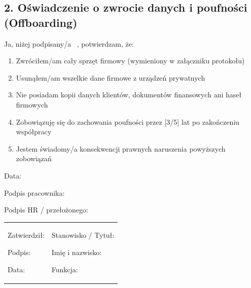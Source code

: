 \documentclass[12pt,a4paper]{article}
\providecommand{\tightlist}{\setlength{\itemsep}{0pt}\setlength{\parskip}{0pt}}
\begin{document}
\subsection{2. Oświadczenie o zwrocie danych i poufności
(Offboarding)}\label{oux15bwiadczenie-o-zwrocie-danych-i-poufnoux15bci-offboarding}

Ja, niżej podpisany/a {~}, potwierdzam, że:

\begin{enumerate}
\tightlist
\item
  Zwróciłem/am cały sprzęt firmowy (wymieniony w załączniku protokołu)
\item
  Usunąłem/am wszelkie dane firmowe z urządzeń prywatnych
\item
  Nie posiadam kopii danych klientów, dokumentów finansowych ani haseł
  firmowych
\item
  Zobowiązuję się do zachowania poufności przez {[}3/5{]} lat po
  zakończeniu współpracy
\item
  Jestem świadomy/a konsekwencji prawnych naruszenia powyższych
  zobowiązań
\end{enumerate}

Data: \underline{\hspace{3cm}}

Podpis pracownika: \underline{\hspace{3cm}}

Podpis HR / przełożonego: \underline{\hspace{3cm}}

\begin{longtable}[]{@{}
  >{\raggedright\arraybackslash}p{}
  >{\raggedright\arraybackslash}p{}@{}}
\toprule\noalign{}
\endhead
\bottomrule\noalign{}
\endlastfoot
\begin{minipage}[t]{\linewidth}\raggedright
Zatwierdził:

Podpis: \underline{\hspace{3cm}}

Data: \underline{\hspace{4cm}}
\end{minipage} & \begin{minipage}[t]{\linewidth}\raggedright
Stanowisko / Tytuł:

Imię i nazwisko: \underline{\hspace{3cm}}

Funkcja: \underline{\hspace{3cm}}
\end{minipage} \\
\end{longtable}
\end{document}
